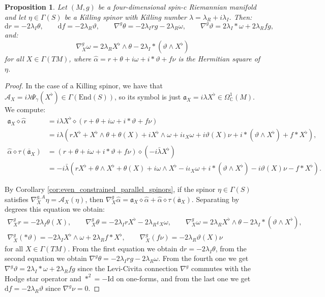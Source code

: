 \documentclass[10pt,a4paper,twoside,reqno]{amsart}
\theoremstyle{plain}
\newtheorem{prop}[thm]{Proposition}
\theoremstyle{definition}
\theoremstyle{remark}
\newcommand{\End}{\mathrm{End}}
\def\C{\mathbb{C}}
\def\dd{\mathrm{d}}
\def\Id{\mathrm{Id}}
\def\fra{\mathfrak{a}}
\def\cA{\mathcal{A}}
\def\dd{\mathrm{d}}
\begin{document}
\begin{prop}\label{prop:(4,0)_Killing}
    Let $(M,g)$ be a four-dimensional spin-c Riemannian manifold and let $\eta\in\Gamma(S)$ be a Killing spinor with Killing number $\lambda=\lambda_R+i\lambda_I$. Then: $$\dd r=-2\lambda_I\theta,\qquad \dd f=-2\lambda_R\vartheta,\qquad \nabla^g\theta=-2\lambda_Irg-2\lambda_R\omega,\qquad \nabla^g\vartheta=2\lambda_I*\omega+2\lambda_Rfg,$$ and: $$\nabla^g_X\omega=2\lambda_RX^\flat\wedge\theta-2\lambda_I*(\vartheta\wedge X^\flat)$$ for all $X\in\Gamma(TM)$, where $\widehat{\alpha}=r+\theta+i\omega+i*\vartheta+f\nu$ is the Hermitian square of $\eta$.
\end{prop}

\begin{proof}
    In the case of a Killing spinor, we have that $\cA_X=i\lambda\Psi_\gamma(X^\flat)\in\Gamma(\End(S))$, so its symbol is just $\fra_X=i\lambda X^\flat\in\Omega^1_\C(M)$. We compute: \begin{align*}
        \fra_X\diamond\widehat{\alpha}&=i\lambda X^\flat\diamond(r+\theta+i\omega+i*\vartheta+f\nu)\\
        &=i\lambda(rX^\flat+X^\flat\wedge\theta+\theta(X)+iX^\flat\wedge\omega+i\iota_X\omega+i\vartheta(X)\nu+i*(\vartheta\wedge X^\flat)+f*X^\flat),\\
        \widehat{\alpha}\diamond\tau(\overline{\fra}_X)&=(r+\theta+i\omega+i*\vartheta+f\nu)\diamond(-i\bar\lambda X^\flat)\\
        &=-i\bar{\lambda}(rX^\flat+\theta\wedge X^\flat+\theta(X)+i\omega\wedge X^\flat-i\iota_X\omega+i*(\vartheta\wedge X^\flat)-i\vartheta(X)\nu-f*X^\flat).
    \end{align*}
    
    By Corollary \ref{cor:even_constrained_parallel_spinors}, if the spinor $\eta\in\Gamma(S)$ satisfies $\nabla^{g,A}_X\eta=\cA_X(\eta)$, then $\nabla^g_X\widehat{\alpha}=\fra_X\diamond\widehat{\alpha}+\widehat{\alpha}\diamond\tau(\overline{\fra}_X)$. Separating by degrees this equation we obtain: \begin{gather*}
        \nabla^g_Xr=-2\lambda_I\theta(X),\qquad \nabla^g_X\theta=-2\lambda_IrX^\flat-2\lambda_R\iota_X\omega,\qquad \nabla^g_X\omega=2\lambda_RX^\flat\wedge\theta-2\lambda_I*(\vartheta\wedge X^\flat),\\
        \nabla^g_X(*\vartheta)=-2\lambda_IX^\flat\wedge\omega+2\lambda_Rf*X^\flat,\qquad \nabla^g_X(f\nu)=-2\lambda_R\vartheta(X)\nu
    \end{gather*} for all $X\in\Gamma(TM)$. From the first equation we obtain $\dd r=-2\lambda_I\theta$, from the second equation we obtain $\nabla^g\theta=-2\lambda_Irg-2\lambda_R\omega$. From the fourth one we get $\nabla^g\vartheta=2\lambda_I*\omega+2\lambda_Rfg$ since the Levi-Civita connection $\nabla^g$ commutes with the Hodge star operator and $*^2=-\Id$ on one-forms, and from the last one we get $\dd f=-2\lambda_R\vartheta$ since $\nabla^g\nu=0$.
\end{proof}
\end{document}

